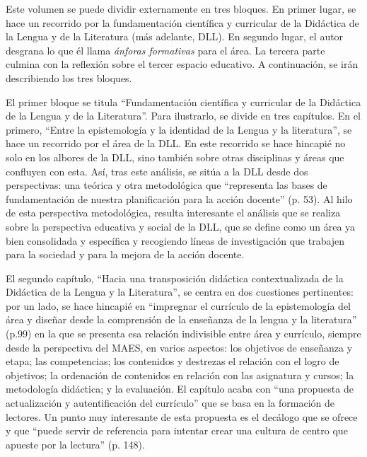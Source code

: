 \documentclass[spanish]{textolivre}
\begin{document}
Este volumen se puede dividir externamente en tres bloques. En primer lugar, se hace un recorrido por la fundamentación científica y curricular de la Didáctica de la Lengua y de la Literatura (más adelante, DLL). En segundo lugar, el autor desgrana lo que él llama \textit{ánforas formativas} para el área. La tercera parte culmina con la reflexión sobre el tercer espacio educativo. A continuación, se irán describiendo los tres bloques.

El primer bloque se titula “Fundamentación científica y curricular de la Didáctica de la Lengua y de la Literatura”. Para ilustrarlo, se divide en tres capítulos. En el primero, “Entre la epistemología y la identidad de la Lengua y la literatura”, se hace un recorrido por el área de la DLL. En este recorrido se hace hincapié no solo en los albores de la DLL, sino también sobre otras disciplinas y áreas que confluyen con esta. Así, tras este análisis, se sitúa a la DLL desde dos perspectivas: una teórica y otra metodológica que “representa las bases de fundamentación de nuestra planificación para la acción docente” (p. 53). Al hilo de esta perspectiva metodológica, resulta interesante el análisis que se realiza sobre la perspectiva educativa y social de la DLL, que se define como un área ya bien consolidada y específica y recogiendo líneas de investigación que trabajen para la sociedad y para la mejora de la acción docente.

El segundo capítulo, “Hacia una transposición didáctica contextualizada de la Didáctica de la Lengua y la Literatura”, se centra en dos cuestiones pertinentes: por un lado, se hace hincapié en “impregnar el currículo de la epistemología del área y diseñar desde la comprensión de la enseñanza de la lengua y la literatura” (p.99) en la que se presenta esa relación indivisible entre área y currículo, siempre desde la perspectiva del MAES, en varios aspectos: los objetivos de enseñanza y etapa; las competencias; los contenidos y destrezas el relación con el logro de objetivos; la ordenación de contenidos en relación con las asignatura y cursos; la metodología didáctica; y la evaluación. El capítulo acaba con “una propuesta de actualización y autentificación del currículo” que se basa en la formación de lectores. Un punto muy interesante de esta propuesta es el decálogo que se ofrece y que “puede servir de referencia para intentar crear una cultura de centro que apueste por la lectura” (p. 148).
\end{document}
